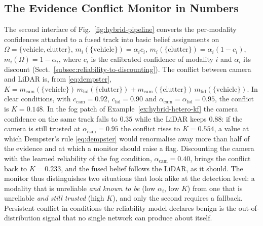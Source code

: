 \subsection{The Evidence Conflict Monitor in Numbers}
\label{subsec:conflict-monitor}
The second interface of Fig.~\ref{fig:hybrid-pipeline} converts the per-modality confidences attached to a fused track into basic belief assignments on $\Omega=\{\text{vehicle},\text{clutter}\}$, $m_i(\{\text{vehicle}\})=\alpha_i c_i$, $m_i(\{\text{clutter}\})=\alpha_i(1-c_i)$, $m_i(\Omega)=1-\alpha_i$, where $c_i$ is the calibrated confidence of modality $i$ and $\alpha_i$ its discount (Sect.~\ref{subsec:reliability-to-discounting}). The conflict between camera and LiDAR is, from \eqref{eq:dempster}, $K=m_{\mathrm{cam}}(\{\text{vehicle}\})\,m_{\mathrm{lid}}(\{\text{clutter}\})+m_{\mathrm{cam}}(\{\text{clutter}\})\,m_{\mathrm{lid}}(\{\text{vehicle}\})$. In clear conditions, with $c_{\mathrm{cam}}=0.92$, $c_{\mathrm{lid}}=0.90$ and $\alpha_{\mathrm{cam}}=\alpha_{\mathrm{lid}}=0.95$, the conflict is $K=0.148$. In the fog patch of Example~\ref{ex:hybrid-hetero-kf} the camera confidence on the same track falls to $0.35$ while the LiDAR keeps $0.88$: if the camera is still trusted at $\alpha_{\mathrm{cam}}=0.95$ the conflict rises to $K=0.554$, a value at which Dempster's rule \eqref{eq:dempster} would renormalise away more than half of the evidence and at which a monitor should raise a flag. Discounting the camera with the learned reliability of the fog condition, $\alpha_{\mathrm{cam}}=0.40$, brings the conflict back to $K=0.233$, and the fused belief follows the LiDAR, as it should. The monitor thus distinguishes two situations that look alike at the detection level: a modality that is unreliable \emph{and known to be} (low $\alpha_i$, low $K$) from one that is unreliable \emph{and still trusted} (high $K$), and only the second requires a fallback. Persistent conflict in conditions the reliability model declares benign is the out-of-distribution signal that no single network can produce about itself.

